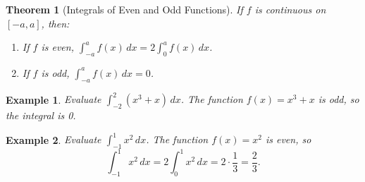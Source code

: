\documentclass[11pt,a4paper]{article}
\newtheorem{example}{Example}
\newtheorem{theorem}{Theorem}
\begin{document}
\begin{theorem}[Integrals of Even and Odd Functions]
If $f$ is continuous on $[-a, a]$, then:
\begin{enumerate}
\item If $f$ is even, $\displaystyle \int_{-a}^a f(x) \, dx = 2 \int_0^a f(x) \, dx$.
\item If $f$ is odd, $\displaystyle \int_{-a}^a f(x) \, dx = 0$.
\end{enumerate}
\end{theorem}
\begin{example}
Evaluate $\displaystyle \int_{-2}^2 (x^3 + x) \, dx$.
The function $f(x) = x^3 + x$ is odd, so the integral is 0.
\end{example}
\begin{example}
Evaluate $\displaystyle \int_{-1}^1 x^2 \, dx$.
The function $f(x) = x^2$ is even, so
\[
\int_{-1}^1 x^2 \, dx = 2 \int_0^1 x^2 \, dx = 2 \cdot \frac{1}{3} = \frac{2}{3}.
\]
\end{example}
\end{document}
